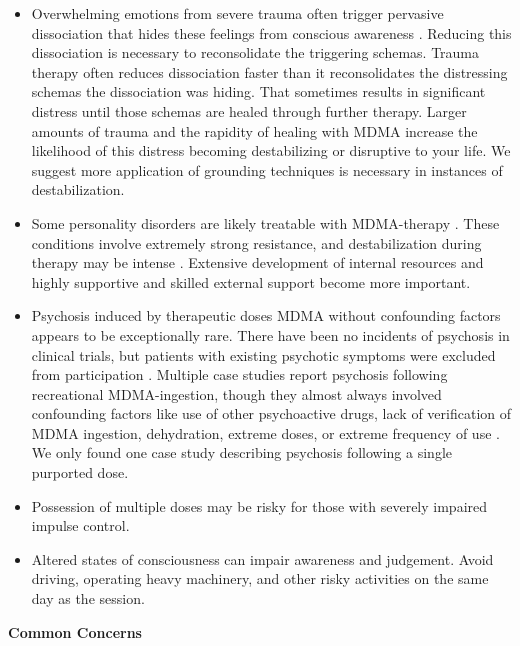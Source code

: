 \documentclass[12pt,letterpaper]{article}
\begin{document}
\begin{itemize}
    \item Overwhelming emotions from severe trauma often trigger pervasive dissociation that hides these feelings from conscious awareness \cite{razviPSIP}. Reducing this dissociation is necessary to reconsolidate the triggering schemas. Trauma therapy often reduces dissociation faster than it reconsolidates the distressing schemas the dissociation was hiding. That sometimes results in significant distress until those schemas are healed through further therapy. Larger amounts of trauma and the rapidity of healing with MDMA increase the likelihood of this distress becoming destabilizing or disruptive to your life. We suggest more application of grounding techniques is necessary in instances of destabilization.  
    \item Some personality disorders are likely treatable with MDMA-therapy \cite{traynorBorderline}. These conditions involve extremely strong resistance, and destabilization during therapy may be intense \cite{razviPSIP}. Extensive development of internal resources and highly supportive and skilled external support become more important.
    \item Psychosis induced by therapeutic doses MDMA without confounding factors appears to be exceptionally rare. There have been no incidents of psychosis in clinical trials, but patients with existing psychotic symptoms were excluded from participation \cite{smithSystematic,mitchellMDMAClinicalTrial2}. Multiple case studies report psychosis following recreational MDMA-ingestion, though they almost always involved confounding factors like use of other psychoactive drugs, lack of verification of MDMA ingestion, dehydration, extreme doses, or extreme frequency of use \cite{mcguirePsychosis,patelPsychosis,vaivaPsychosis}. We only found one case study describing psychosis following a single purported dose.
    \item Possession of multiple doses may be risky for those with severely impaired impulse control.
    \item Altered states of consciousness can impair awareness and judgement. Avoid driving, operating heavy machinery, and other risky activities on the same day as the session.
\end{itemize}
\noindent \textbf{Common Concerns}
\end{document}
